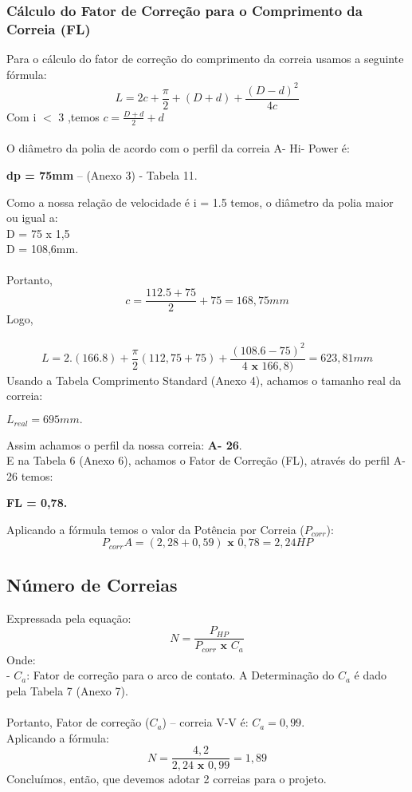 \documentclass[a4paper, 11pt]{article}
\begin{document}
\subsubsection{C\'alculo do Fator de Corre\c{c}\~ao para o Comprimento da Correia (FL)}
Para o c\'alculo do fator de corre\c{c}\~ao do comprimento da correia usamos a
seguinte f\'ormula:\\
$$L=2c+\frac{\pi}{2}+(D+d)+\frac{(D-d)^2}{4c}$$
Com i $<$ 3 ,temos $c=\frac{D+d}{2}+d$ \\\\
O di\^ametro da polia de acordo com o perfil da correia A- Hi- Power é:
\begin{center}
\textbf{dp = 75mm} -- (Anexo 3) - Tabela 11.
\end{center}
Como a nossa rela\c{c}\~ao de velocidade é i = 1.5 temos, o di\^ametro da polia
maior ou igual a:\\
D = 75 x 1,5\\
D = 108,6mm.\\\\
Portanto,\\
$$c=\frac{112.5+75}{2}+75=168,75mm$$
Logo,\\\\
$$L=2.(166.8)+\frac{\pi}{2}(112,75+75)+\frac{(108.6-75)^2}{4\textbf{ x }166,8)}=623,81mm$$
Usando a Tabela Comprimento Standard (Anexo 4), achamos o tamanho
real da correia:\\
\begin{center}
$L_{real} = 695 mm.$\\
\end{center}
Assim achamos o perfil da nossa correia: \textbf{A- 26}.\\
E na Tabela 6 (Anexo 6), achamos o Fator de Corre\c{c}\~ao (FL), atrav\'es do
perfil A- 26 temos:\\
\begin{center}
\textbf{FL = 0,78.}
\end{center}
Aplicando a f\'ormula temos o valor da Pot\^encia por Correia ($P_{corr}$):\\
$$P_{corr}A = (2,28 +0,59) \textbf{ x } 0,78=2,24HP$$
\subsection{N\'umero de Correias}
Expressada pela equa\c{c}\~ao:\\
$$N=\frac{P_{HP}}{P_{corr}\textbf{ x } C_a}$$
Onde:\\
- $C_a$: Fator de corre\c{c}\~ao para o arco de contato. A Determina\c{c}\~ao do $C_a$ é dado
pela Tabela 7 (Anexo 7).\\\\
Portanto, Fator de corre\c{c}\~ao ($C_a$) -- correia V-V é: $C_a = 0,99.$\\
Aplicando a f\'ormula:\\
$$N=\frac{4,2}{2,24\textbf{ x }0,99}=1,89$$
Conclu\'imos, ent\~ao, que devemos adotar 2 correias para o projeto.\\
\end{document}
